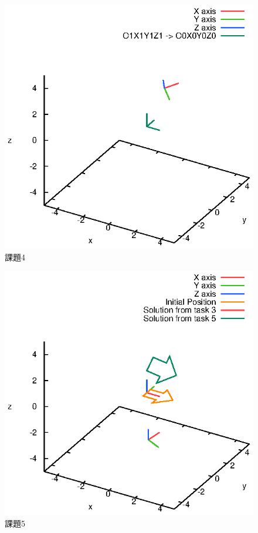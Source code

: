 \documentclass[a4paper,10pt]{jsarticle}
\begin{document}
\begin{figure}[htb]
  \begin{center}
    \includegraphics[clip,width=14cm]{fig/eps/4.eps}
  \end{center}
  \caption{課題4}
  \label{fig:課題4}
\end{figure}

\begin{figure}[htb]
  \begin{center}
    \includegraphics[clip,width=14cm]{fig/eps/5.eps}
  \end{center}
  \caption{課題5}
  \label{fig:課題5}
\end{figure}
\end{document}
